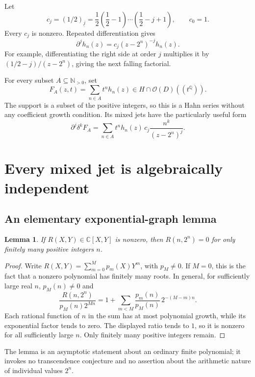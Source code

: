 \documentclass[11pt,a4paper]{article}
\numberwithin{equation}{section}
\newtheorem{lemma}[theorem]{Lemma}
\theoremstyle{definition}
\theoremstyle{remark}
\newcommand{\C}{\mathbb C}
\newcommand{\Q}{\mathbb Q}
\newcommand{\N}{\mathbb N}
\newcommand{\OO}{\mathcal O}
\newcommand{\EDer}{\delta}
\newcommand{\ff}[2]{(#1)_{\underline{#2}}}
\begin{document}
Let
\[
 c_j=\ff{1/2}{j}=\frac12\left(\frac12-1\right)\cdots
                         \left(\frac12-j+1\right),\qquad c_0=1.
\]
Every $c_j$ is nonzero. Repeated differentiation gives
\begin{equation}\label{tail:eq:hnjet}
 \partial^jh_n(z)=c_j(z-2^n)^{-j}h_n(z).
\end{equation}
For example, differentiating the right side at order $j$ multiplies it
by $(1/2-j)/(z-2^n)$, giving the next falling factorial.

For every subset $A\subseteq\N_{>0}$, set
\begin{equation}\label{tail:eq:FA}
 F_A(z,t)=\sum_{n\in A}t^nh_n(z)\in H\cap\OO(D)((t^\Q)).
\end{equation}
The support is a subset of the positive integers, so this is a Hahn
series without any coefficient growth condition. Its mixed jets have the
particularly useful form
\begin{equation}\label{tail:eq:mixedcoefficients}
 \partial^j\EDer^kF_A
   =\sum_{n\in A}t^nh_n(z)\,
             c_j\frac{n^k}{(z-2^n)^j}.
\end{equation}

\section{Every mixed jet is algebraically independent}\label{tail:sec:mixed}

\subsection{An elementary exponential-graph lemma}
\begin{lemma}\label{tail:lem:expgraph}
If $R(X,Y)\in\C[X,Y]$ is nonzero, then $R(n,2^n)=0$ for only finitely
many positive integers $n$.
\end{lemma}
\begin{proof}
Write $R(X,Y)=\sum_{m=0}^M p_m(X)Y^m$, with $p_M\ne0$.
If $M=0$, this is the fact that a nonzero polynomial has finitely many
roots. In general, for sufficiently large real $n$, $p_M(n)\ne0$ and
\[
 \frac{R(n,2^n)}{p_M(n)2^{Mn}}
   =1+\sum_{m<M}\frac{p_m(n)}{p_M(n)}\,2^{-(M-m)n}.
\]
Each rational function of $n$ in the sum has at most polynomial growth,
while its exponential factor tends to zero. The displayed ratio tends
to $1$, so it is nonzero for all sufficiently large $n$. Only finitely
many positive integers remain.
\end{proof}

The lemma is an asymptotic statement about an ordinary finite polynomial;
it invokes no transcendence conjecture and no assertion about the
arithmetic nature of individual values $2^n$.
\end{document}
